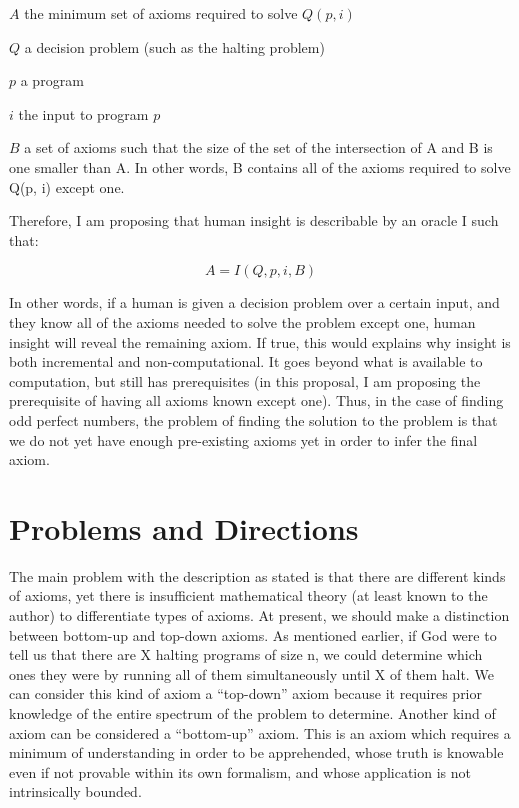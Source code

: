\begin{description}
\item{$A$}
the minimum set of axioms required to solve $Q(p, i)$

\item{$Q$}
a decision problem (such as the halting problem)

\item{$p$}
a program

\item{$i$} 
the input to program $p$

\item{$B$}
a set of axioms such that the size of the set of the intersection of A and B is one smaller than A.  In other words, B contains all of the axioms required to solve Q(p, i) except one.
\end{description}

Therefore, I am proposing that human insight is describable by an oracle I such that:

$$ A = I(Q, p, i, B) $$

In other words, if a human is given a decision problem over a certain input, and they know all of the axioms needed to solve the problem except one, human insight will reveal the remaining axiom.  If true, this would explains why insight is both incremental and non-computational.  It goes beyond what is available to computation, but still has prerequisites (in this proposal, I am proposing the prerequisite of having all axioms known except one).  Thus, in the case of finding odd perfect numbers, the problem of finding the solution to the problem is that we do not yet have enough pre-existing axioms yet in order to infer the final axiom.

\section{Problems and Directions}

The main problem with the description as stated is that there are different kinds of axioms, yet there is insufficient mathematical theory (at least known to the author) to differentiate types of axioms.  At present, we should make a distinction between bottom-up and top-down axioms.  As mentioned earlier, if God were to tell us that there are X halting programs of size n, we could determine which ones they were by running all of them simultaneously until X of them halt.  We can consider this kind of axiom a ``top-down'' axiom because it requires prior knowledge of the entire spectrum of the problem to determine.  Another kind of axiom can be considered a ``bottom-up'' axiom.  This is an axiom which requires a minimum of understanding in order to be apprehended, whose truth is knowable even if not provable within its own formalism, and whose application is not intrinsically bounded.  

